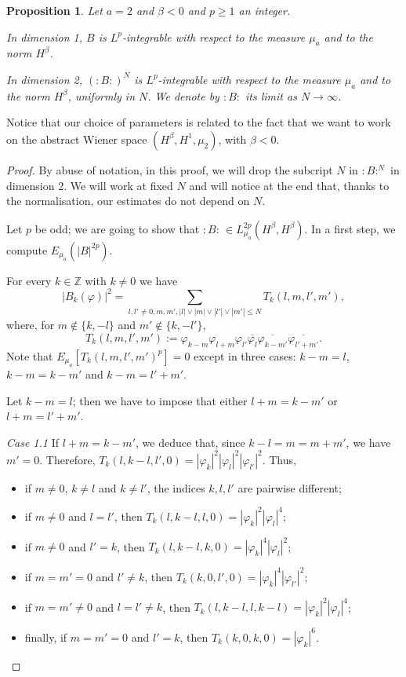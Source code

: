\documentclass[11pt,leqno]{amsart}
\newtheorem{prop}{Proposition}[section]
\newcommand{\Z}{\mathbb{Z}}
\begin{document}
\begin{prop}
\label{prop1}
 Let $a=2$ and $\beta <0$ and $p\geq 1$ an integer.

In dimension 1,   $B$ is $L^p$-integrable with respect to the measure $\mu_a$ and to the norm $H^\beta$.

In dimension 2,  $(:B:)^N$  is $L^p$-integrable with respect to the measure $\mu_a$ and to the norm $H^\beta$, uniformly in $N$. 
We denote by $:B:$  its limit  as $N\to \infty$.

\end{prop}
Notice that our choice of parameters is related to the fact that we want to work on the abstract Wiener space $(H^\beta ,H^1 ,\mu_2)$, with $\beta<0$.
\begin{proof}
By abuse of notation, in this proof, we will drop the subcript $N$ in $:B:^N$ in dimension 2.  We will work at fixed $N$ and will notice at the end that, thanks to the normalisation,  
 our estimates do not depend on $N$. 
 
Let $p$ be odd; we are going to show that $:B:\, \in L^{2p}_{\mu_a} (H^\beta , H^\beta)$.
In a first step, we  compute  
$E_{\mu_a}  (|B|^{2p} )$.  
\smallskip

For every $k\in \Z$ with $k\neq 0$ we have 
$$|B_k (\varphi)|^2 =  \sum_{l,l'\neq 0, m,m', |l|\vee |m|\vee |l'|\vee |m'| \leq N}T_k(l,m,l',m'), $$
 where, for $m\not\in \{k, -l\}$ and $m'\not\in \{ k, -l'\}$,  
\[ T_k(l,m,l',m'):= \varphi_{k-m} \varphi_{l+m}\varphi_{l'}  \overline{\varphi_l}  \overline{\varphi_{k-m'}} \overline{\varphi_{l'+m'}}.\]
Note that $E_{\mu_a} [T_k(l,m,l',m')^{p} ]= 0$ except in three cases: $k-m=l$, $k-m=k-m'$ and $k-m=l'+m'$.\bigskip

\; Let  $k-m=l$;  then we have to impose that either $l+m=k-m'$ or $l+m=l'+m'$.

 {\it Case 1.1} \; If $l+m=k-m'$, we deduce that, since $k-l=m=m+m'$, we have $m'=0$. Therefore, $T_k(l,k-l,l',0)= |\varphi_k|^2 |\varphi_l|^2 |\varphi_{l'}|^2$. 
Thus, 
\begin{itemize} 
\item if  $m\neq 0$, $k\neq l$  and $k\neq l'$,  the indices $k,l,l'$ are pairwise different;
\item if  $m\neq 0$ and $l=l'$, then $T_k(l,k-l,l,0)= |\varphi_k|^2 |\varphi_l|^4 $;
\item if  $m\neq 0$ and $l'=k$, then $T_k(l, k-l, k, 0) = |\varphi_k|^4 |\varphi_l|^2 $;
\item if $m=m'=0$ and $l'\neq k$, then $T_k(k,0,l',0)=  |\varphi_k|^4 |\varphi_{l'}|^2 $;
\item if $m=m'\neq 0$ and $l=l'\neq k$, then $T_k(l,k-l,l,k-l) = |\varphi_k|^2 |\varphi_l|^4 $;
\item finally, if $m=m'=0$ and $l'= k$, then $T_k(k,0,k,0) =  |\varphi_k|^6 $. 
\end{itemize} 


\end{proof}
\end{document}
